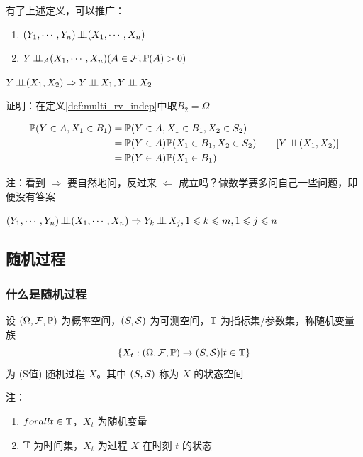 有了上述定义，可以推广：

\begin{enumerate}
    \item $(Y_1,\cdots,Y_n)\operatorname{\perp\!\!\!\perp} (X_1,\cdots,X_n)$
    \item $Y\operatorname{\perp\!\!\!\perp}_A (X_1,\cdots,X_n) (A\in \mathcal{F},\mathbb{P}(A)>0)$
\end{enumerate}

\begin{property}
    $Y\ind (X_1,X_2)\Rightarrow Y\ind X_1,Y\ind X_2$
\end{property}

证明：在定义\ref{def:multi_rv_indep}中取$B_2=\Omega$

\[
\begin{aligned}
    \mathbb{P}(Y\in A,X_1\in B_1)&=\mathbb{P}(Y\in A,X_1\in B_1,X_2\in S_2)\\
    &=\mathbb{P}(Y\in A)\mathbb{P}(X_1\in B_1,X_2\in S_2)\qquad [Y\operatorname{\perp\!\!\!\perp} (X_1,X_2)]\\
    &=\mathbb{P}(Y\in A)\mathbb{P}(X_1\in B_1)
\end{aligned}
\]

注：看到 $\Rightarrow$ 要自然地问，反过来 $\Leftarrow$ 成立吗？做数学要多问自己一些问题，即便没有答案

\begin{corollary}
    $(Y_1,\cdots,Y_n)\operatorname{\perp\!\!\!\perp} (X_1,\cdots,X_n)\Rightarrow Y_k\operatorname{\perp\!\!\!\perp} X_j, 1\leqslant k\leqslant m,1\leqslant j\leqslant n$
\end{corollary}

\subsection{随机过程}

\subsubsection{什么是随机过程}

\begin{definition}[随机过程]
    设 $(\Omega, \mathcal{F}, \mathbb{P})$ 为概率空间，$(S,\mathcal{S})$ 为可测空间，$\mathbb{T}$ 为指标集/参数集，称随机变量族
    \[
    \{X_t: (\Omega,\mathcal{F},\mathbb{P})\rightarrow (S,\mathcal{S})|t\in \mathbb{T}\}
    \]
    为 (S值) 随机过程 $X$。其中 $(S,\mathcal{S})$ 称为 $X$ 的状态空间

    注：\begin{enumerate}
        \item $forall t\in \mathbb{T}$，$X_t$ 为随机变量
        \item $\mathbb{T}$ 为时间集，$X_t$ 为过程 $X$ 在时刻 $t$ 的状态
    \end{enumerate}
\end{definition}

